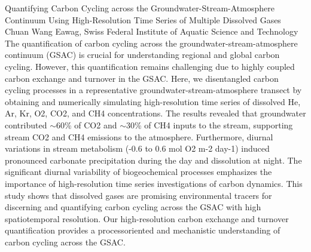 \begin{conf-abstract}
{Quantifying Carbon Cycling across the Groundwater-Stream-Atmosphere Continuum Using High-Resolution Time Series of Multiple Dissolved Gases}
{Chuan Wang}
{Eawag, Swiss Federal Institute of Aquatic Science and Technology}
{The quantification of carbon cycling across the groundwater-stream-atmosphere
continuum (GSAC) is crucial for understanding regional and global carbon cycling. However, this
quantification remains challenging due to highly coupled carbon exchange and turnover in the GSAC.
Here, we disentangled carbon cycling processes in a representative groundwater-stream-atmosphere
transect by obtaining and numerically simulating high-resolution time series of dissolved He, Ar, Kr,
O2, CO2, and CH4 concentrations. The results revealed that groundwater contributed $\sim$60\% of CO2
and $\sim$30\% of CH4 inputs to the stream, supporting stream CO2 and CH4 emissions to the atmosphere.
Furthermore, diurnal variations in stream metabolism (-0.6 to 0.6 mol O2 m-2 day-1) induced
pronounced carbonate precipitation during the day and dissolution at night. The significant diurnal
variability of biogeochemical processes emphasizes the importance of high-resolution time series
investigations of carbon dynamics. This study shows that dissolved gases are promising environmental
tracers for discerning and quantifying carbon cycling across the GSAC with high spatiotemporal
resolution. Our high-resolution carbon exchange and turnover quantification provides a processoriented
and mechanistic understanding of carbon cycling across the GSAC.}
\end{conf-abstract}
